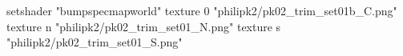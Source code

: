 setshader "bumpspecmapworld"
    texture 0 "philipk2/pk02_trim_set01b_C.png"
    texture n "philipk2/pk02_trim_set01_N.png"
    texture s "philipk2/pk02_trim_set01_S.png"